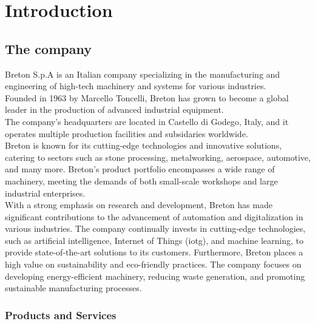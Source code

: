 \chapter{Introduction}
\label{cap:Introduction}
% 
% 
% 

\section{The company}

Breton S.p.A is an Italian company specializing in the manufacturing and engineering of high-tech machinery and systems for various industries. \\
Founded in 1963 by Marcello Toncelli, Breton has grown to become a global leader in the production of advanced industrial equipment. \\
The company's headquarters are located in Castello di Godego, Italy, 
and it operates multiple production facilities and subsidaries worldwide.\\
Breton is known for its cutting-edge technologies and innovative solutions, catering to sectors such as stone processing, metalworking, aerospace, automotive, and many more.
Breton's product portfolio encompasses a wide range of machinery, meeting the demands of both small-scale workshops and large industrial enterprises.\\
With a strong emphasis on research and development, Breton has made significant contributions to the advancement of automation and digitalization in various industries. The company continually invests in cutting-edge technologies, such as artificial intelligence, Internet of Things (\gls{iotg}), and machine learning, to provide state-of-the-art solutions to its customers.
Furthermore, Breton places a high value on sustainability and eco-friendly practices. The company focuses on developing energy-efficient machinery, reducing waste generation, and promoting sustainable manufacturing processes.
\subsection{Products and Services}
